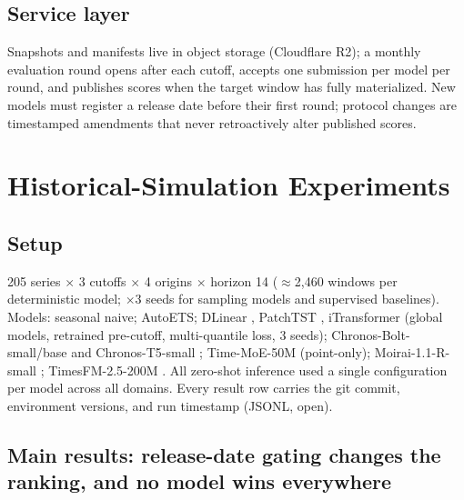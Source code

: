 \documentclass{article}
\begin{document}
\subsection{Service layer}

Snapshots and manifests live in object storage (Cloudflare R2); a monthly evaluation round opens after each cutoff, accepts one submission per model per round, and publishes scores when the target window has fully materialized. New models must register a release date before their first round; protocol changes are timestamped amendments that never retroactively alter published scores.

\section{Historical-Simulation Experiments}\label{sec:experiments}

\subsection{Setup}

205 series $\times$ 3 cutoffs $\times$ 4 origins $\times$ horizon 14 ($\approx$2{,}460 windows per deterministic model; $\times$3 seeds for sampling models and supervised baselines). Models: seasonal naive; AutoETS; DLinear \citep{zeng2023dlinear}, PatchTST \citep{nie2023patchtst}, iTransformer \citep{liu2024itransformer} (global models, retrained pre-cutoff, multi-quantile loss, 3 seeds); Chronos-Bolt-small/base and Chronos-T5-small \citep{ansari2024chronos}; Time-MoE-50M \citep{shi2025timemoe} (point-only); Moirai-1.1-R-small \citep{woo2024moirai}; TimesFM-2.5-200M \citep{das2024timesfm}. All zero-shot inference used a single configuration per model across all domains. Every result row carries the git commit, environment versions, and run timestamp (JSONL, open).

\subsection{Main results: release-date gating changes the ranking, and no model wins everywhere}

\begin{table}[t]
  \caption{Clean scores on LiveTS (historical simulation, 205 series, horizon 14, future-only cutoffs). Geometric mean across series of per-series mean MASE/WQL; lower is better; 95\% cross-series bootstrap CI ($B{=}1000$). Best in \textbf{bold}, second best \underline{underlined}. $^{\dagger}$fewer than three clean cutoffs due to release-date gating --- compare on overlapping cutoffs only. Supervised baselines (release ``per-cutoff'') are retrained strictly pre-cutoff, so every cutoff is clean for them.}
  \label{tab:main}
  \centering
  \small
  
\end{table}
\end{document}
